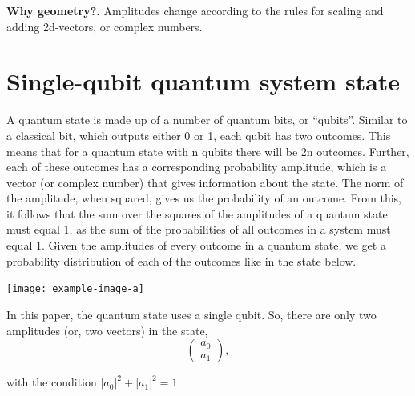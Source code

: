 \documentclass[11pt, letterpaper]{article}
\renewcommand{\myboldhead}[1]{\vspace{.1in}\hspace{-.14in}\textbf{#1.}}
\begin{document}
\myboldhead{Why geometry?}
Amplitudes change according to the rules for scaling and adding 2d-vectors, or complex numbers.


\section{Single-qubit quantum system state}
\label{sec:state}

A quantum state is made up of a number of quantum bits, or “qubits”. Similar to a classical bit, which outputs either 0 or 1, each qubit has two outcomes. This means that for a quantum state with n qubits there will be 2n outcomes. Further, each of these outcomes has a corresponding probability amplitude, which is a vector (or complex number) that gives information about the state. The norm of the amplitude, when squared, gives us the probability of an outcome. From this, it follows that the sum over the squares of the amplitudes of a quantum state must equal 1, as the sum of the probabilities of all outcomes in a system must equal 1. Given the amplitudes of every outcome in a quantum state, we get a probability distribution of each of the outcomes like in the state below.

\texttt{[image: example-image-a]}

In this paper, the quantum state uses a single qubit. So, there are only two amplitudes (or, two vectors) in the state,
\begin{equation}
	\begin{pmatrix} a_0  \\ a_1 \end{pmatrix},
\end{equation}

with the condition $|a_0|^2 + |a_1|^2 = 1$.
\end{document}
